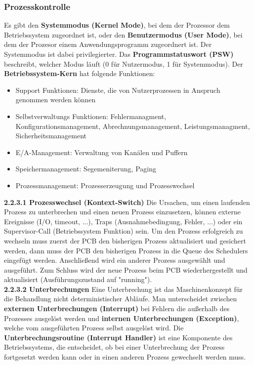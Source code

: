 \documentclass{article}
\begin{document}
\subsubsection{Prozesskontrolle}
    Es gibt den \textbf{Systemmodus (Kernel Mode)}, bei dem der Prozessor dem Betriebssystem zugeordnet ist, oder den \textbf{Benutzermodus (User Mode)}, bei dem der Prozesor einem Anwendungsprogramm zugeordnert ist. Der Systemmodus ist dabei privilegierter. Das \textbf{Programmstatuswort (PSW)} beschreibt, welcher Modus läuft (0 für Nutzermodus, 1 für Systemmodus).\newline
    Der \textbf{Betriebssystem-Kern} hat folgende Funktionen:
    \begin{itemize}
        \item Support Funktionen: Dienste, die von Nutzerprozessen in Anspruch genommen werden können
        \item Selbstverwaltungs Funktionen: Fehlermanagment, Konfigurationsmanagement, Abrechnungsmanagement, Leistungsmanagment, Sicherheitsmanagement
        \item E/A-Management: Verwaltung von Kanälen und Puffern
        \item Speichermanagement: Segemeniterung, Paging
        \item Prozessmanagement: Prozesserzeugung und Prozesswechsel
    \end{itemize}
    \textbf{2.2.3.1 Prozesswechsel (Kontext-Switch)}\newline
    Die Ursachen, um einen laufenden Prozess zu unterbrechen und einen neuen Prozess einzusetzen, können externe Ereignisse (I/O, timeout, ...), Traps (Ausnahmebedingung, Fehler, ...) oder ein Supervisor-Call (Betriebssystem Funktion) sein.\newline
    Um den Prozess erfolgreich zu wechseln muss zuerst der PCB den bisherigen Prozess aktualisiert und gesichert werden, dann muss der PCB den bisherigen Prozess in die Queue des Schedulers eingefügt werden. Anschließend wird ein anderer Prozess ausgewählt und ausgeführt. Zum Schluss wird der neue Prozess beim PCB wiederhergestellt und aktualisiert (Ausführungszustand auf "running").\newline
    \\
    \textbf{2.2.3.2 Unterbrechungen}\newline
    Eine Unterbrechung ist das Maschinenkonzept für die Behandlung nicht deterministischer Abläufe.\newline
    Man unterscheidet zwischen \textbf{externen Unterbrechungen (Interrupt)} bei Fehlern die außerhalb des Prozesses ausgelöst werden und \textbf{internen Unterbrechungen (Exception)}, welche vom ausgeführten Prozess selbst ausgelöst wird. Die \textbf{Unterbrechungsroutine (Interrupt Handler)} ist eine Komponente des Betriebssystems, die entscheidet, ob bei einer Unterbrechung der Prozess fortgesetzt werden kann oder in einen anderen Prozess gewechselt werden muss.\newline
\end{document}
